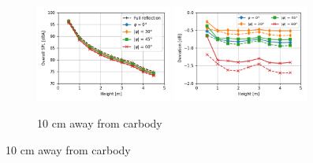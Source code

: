 \begin{figure}[H]
	\centering
	\begin{subfigure}[b]{\textwidth}
		\centering
		\includegraphics[width=0.49\textwidth]{fig/chap5/impedance/overall_SPL/overall_SPL_pos_a.png}
		\includegraphics[width=0.49\textwidth]{fig/chap5/impedance/overall_SPL/deviation_pos_a.png}
		\caption{10 cm away from carbody}
	\end{subfigure}
\end{figure}

